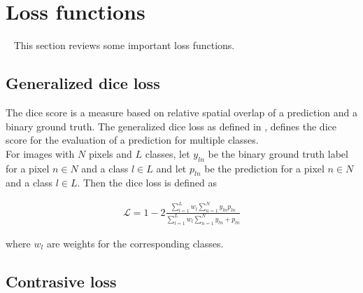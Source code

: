 \section{Loss functions}~\label{ssec:losses}
This section reviews some important loss functions.

\subsection{Generalized dice loss}\label{ssec:loss_dice}
The dice score is a measure based on relative spatial overlap of a prediction and a binary ground truth. The generalized dice loss as defined in \cite{Sudre_2017}, defines the dice score for the evaluation of a prediction for multiple classes.\\
For images with $N$ pixels and $L$ classes, let $y_{ln}$ be the binary ground truth label for a pixel $n \in N$ and a class $l \in L$ and let $p_{ln}$ be the prediction for a pixel $n \in N$ and a class $l \in L$. Then the dice loss is defined as

\begin{align}
	\mathcal{L} = 1 - 2 \frac{\sum_{l=1}^L w_l \sum_{n=1}^N y_{ln} p_{ln}}{\sum_{l=1}^L w_l \sum_{n=1}^N y_{ln} + p_{ln}}
\end{align}

where $w_l$ are weights for the corresponding classes.

\subsection{Contrasive loss}\label{ssec:loss_contrastive}

